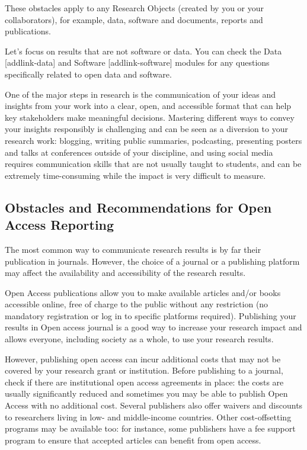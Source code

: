 \documentclass[
  letterpaper,
  DIV=11,
  numbers=noendperiod]{scrreport}
\begin{document}
These obstacles apply to any Research Objects (created by you or your
collaborators), for example, data, software and documents, reports and
publications.

Let's focus on results that are not software or data. You can check the
Data {[}addlink-data{]} and Software {[}addlink-software{]} modules for
any questions specifically related to open data and software.

One of the major steps in research is the communication of your ideas
and insights from your work into a clear, open, and accessible format
that can help key stakeholders make meaningful decisions. Mastering
different ways to convey your insights responsibly is challenging and
can be seen as a diversion to your research work: blogging, writing
public summaries, podcasting, presenting posters and talks at
conferences outside of your discipline, and using social media requires
communication skills that are not usually taught to students, and can be
extremely time-consuming while the impact is very difficult to measure.

\hypertarget{obstacles-and-recommendations-for-open-access-reporting}{%
\subsection{Obstacles and Recommendations for Open Access
Reporting}\label{obstacles-and-recommendations-for-open-access-reporting}}

The most common way to communicate research results is by far their
publication in journals. However, the choice of a journal or a
publishing platform may affect the availability and accessibility of the
research results.

Open Access publications allow you to make available articles and/or
books accessible online, free of charge to the public without any
restriction (no mandatory registration or log in to specific platforms
required). Publishing your results in Open access journal is a good way
to increase your research impact and allows everyone, including society
as a whole, to use your research results.

However, publishing open access can incur additional costs that may not
be covered by your research grant or institution. Before publishing to a
journal, check if there are institutional open access agreements in
place: the costs are usually significantly reduced and sometimes you may
be able to publish Open Access with no additional cost. Several
publishers also offer waivers and discounts to researchers living in
low- and middle-income countries. Other cost-offsetting programs may be
available too: for instance, some publishers have a fee support program
to ensure that accepted articles can benefit from open access.
\end{document}
